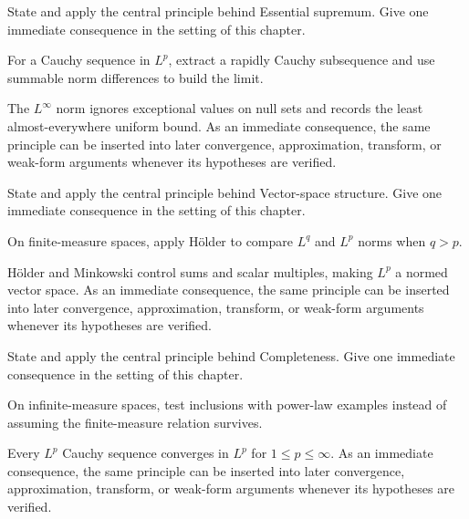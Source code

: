 \begin{exercise}\label{exr:iii06-03}
State and apply the central principle behind Essential supremum. Give one immediate consequence in the setting of this chapter.
\end{exercise}
\begin{hint}
For a Cauchy sequence in \(L^p\), extract a rapidly Cauchy subsequence and use summable norm differences to build the limit.
\end{hint}
\begin{solution}
The $L^\infty$ norm ignores exceptional values on null sets and records the least almost-everywhere uniform bound. As an immediate consequence, the same principle can be inserted into later convergence, approximation, transform, or weak-form arguments whenever its hypotheses are verified.
\end{solution}

\begin{exercise}\label{exr:iii06-04}
State and apply the central principle behind Vector-space structure. Give one immediate consequence in the setting of this chapter.
\end{exercise}
\begin{hint}
On finite-measure spaces, apply Hölder to compare \(L^q\) and \(L^p\) norms when \(q>p\).
\end{hint}
\begin{solution}
Hölder and Minkowski control sums and scalar multiples, making $L^p$ a normed vector space. As an immediate consequence, the same principle can be inserted into later convergence, approximation, transform, or weak-form arguments whenever its hypotheses are verified.
\end{solution}

\begin{exercise}\label{exr:iii06-05}
State and apply the central principle behind Completeness. Give one immediate consequence in the setting of this chapter.
\end{exercise}
\begin{hint}
On infinite-measure spaces, test inclusions with power-law examples instead of assuming the finite-measure relation survives.
\end{hint}
\begin{solution}
Every $L^p$ Cauchy sequence converges in $L^p$ for $1\le p\le\infty$. As an immediate consequence, the same principle can be inserted into later convergence, approximation, transform, or weak-form arguments whenever its hypotheses are verified.
\end{solution}

